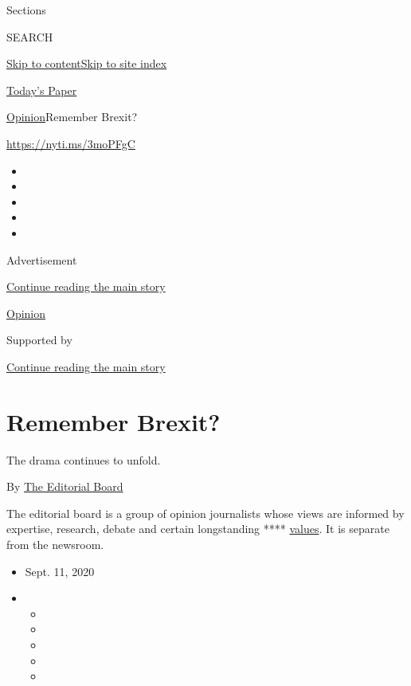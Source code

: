 Sections

SEARCH

\protect\hyperlink{site-content}{Skip to
content}\protect\hyperlink{site-index}{Skip to site index}

\href{https://myaccount.nytimes3xbfgragh.onion/auth/login?response_type=cookie\&client_id=vi}{}

\href{https://www.nytimes3xbfgragh.onion/section/todayspaper}{Today's
Paper}

\href{/section/opinion}{Opinion}\textbar{}Remember Brexit?

\url{https://nyti.ms/3moPFgC}

\begin{itemize}
\item
\item
\item
\item
\item
\end{itemize}

Advertisement

\protect\hyperlink{after-top}{Continue reading the main story}

\href{/section/opinion}{Opinion}

Supported by

\protect\hyperlink{after-sponsor}{Continue reading the main story}

\hypertarget{remember-brexit}{%
\section{Remember Brexit?}\label{remember-brexit}}

The drama continues to unfold.

By
\href{https://www.nytimes3xbfgragh.onion/interactive/opinion/editorialboard.html}{The
Editorial Board}

The editorial board is a group of opinion journalists whose views are
informed by expertise, research, debate and certain longstanding ****
\href{https://www.nytimes3xbfgragh.onion/interactive/2018/opinion/editorialboard.html}{values}.
It is separate from the newsroom.

\begin{itemize}
\item
  Sept. 11, 2020
\item
  \begin{itemize}
  \item
  \item
  \item
  \item
  \item
  \end{itemize}
\end{itemize}

